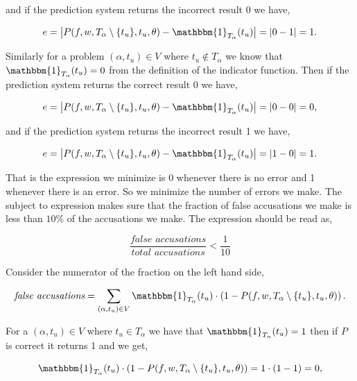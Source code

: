 and if the prediction system returns the incorrect result 0 we have,

\begin{equation}
    e = \left|
        P(f, w, T_\alpha \setminus \{t_u\}, t_u, \theta) -
        \mathbbm{1}_{T_\alpha}(t_u)
    \right| = |0 - 1| = 1.
\end{equation}

Similarly for a problem $(\alpha, t_u) \in V$ where $t_u \notin T_\alpha$ we
know that $\mathbbm{1}_{T_\alpha}(t_u) = 0$ from the definition of the indicator
function. Then if the prediction system returns the correct result 0 we have,

\begin{equation}
    e = \left|
        P(f, w, T_\alpha \setminus \{t_u\}, t_u, \theta) -
        \mathbbm{1}_{T_\alpha}(t_u)
    \right| = |0 - 0| = 0, \end{equation}

and if the prediction system returns the incorrect result 1 we have,

\begin{equation}
    e = \left|
        P(f, w, T_\alpha \setminus \{t_u\}, t_u, \theta) -
        \mathbbm{1}_{T_\alpha}(t_u)
    \right| = |1 - 0| = 1.
\end{equation}

That is the expression we minimize is 0 whenever there is no error and 1
whenever there is an error. So we minimize the number of errors we make. The
subject to expression makes sure that the fraction of false accusations we make
is less than $10\%$ of the accusations we make. The expression should be read
as,

\begin{equation}
    \frac{\textit{false accusations}}{\textit{total accusations}} < \frac{1}{10}
\end{equation}

Consider the numerator of the fraction on the left hand side,

\begin{equation}
    \textit{false accusations} = \sum_{(\alpha, t_u) \in V}
    \mathbbm{1}_{T_\alpha}(t_u) \cdot
    \left(1 - P(f, w, T_\alpha \setminus \{t_u\}, t_u, \theta)\right).
\end{equation}

For a $(\alpha, t_u) \in V$ where $t_u \in T_\alpha$ we have that
$\mathbbm{1}_{T_\alpha}(t_u) = 1$ then if $P$ is correct it returns 1 and we
get,

\begin{equation}
    \mathbbm{1}_{T_\alpha}(t_u) \cdot
    \left(1 - P(f, w, T_\alpha \setminus \{t_u\}, t_u, \theta)\right) =
    1 \cdot (1 - 1) = 0,
\end{equation}

